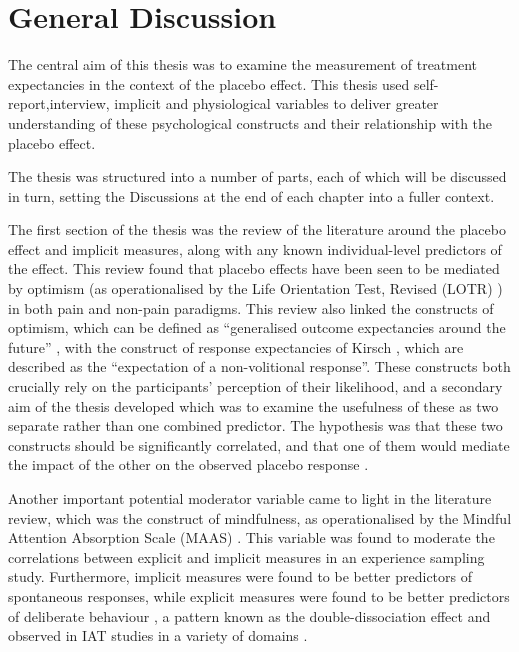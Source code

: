 

\section{General Discussion}

The central aim of this thesis was to examine the measurement of treatment
expectancies in the context of the placebo effect. This thesis used self-report,interview, implicit and physiological variables to deliver greater understanding of these psychological constructs and their relationship with the placebo effect.


The thesis was structured into a number of parts, each of which will be discussed in turn, setting the Discussions at the end of each chapter into a fuller context. 

The first section of the thesis was the review of the literature around the placebo effect and implicit measures, along with any known individual-level predictors of the effect. This review found that placebo effects have been seen to be mediated by optimism (as operationalised by the Life Orientation Test, Revised (LOTR) \cite{Scheier1994}) \cite{Geers2005,morton2009reproducibility} in both pain and non-pain paradigms. This review also linked the constructs of optimism, which can be defined as ``generalised outcome expectancies around the future'' \cite{Carver2010}, with the construct of response expectancies of Kirsch \cite{Kirsch1985,Kirsch1997}, which are described as the ``expectation of a non-volitional response''. These constructs both crucially rely on the participants' perception of their likelihood, and a secondary aim of the thesis developed which was to examine the usefulness of these as two separate rather than one combined predictor. The hypothesis was that these two constructs should be significantly correlated, and that one of them would mediate the impact of the other on the observed placebo response \cite{Geers2005}. 

Another important potential moderator variable came to light in the literature review, which was the construct of mindfulness, as operationalised by the Mindful Attention Absorption Scale (MAAS) \cite{brown2003benefits}. This variable was found to moderate the correlations between explicit and implicit measures in an experience sampling study. Furthermore, implicit measures were found to be better predictors of spontaneous responses, while explicit measures were found to be better predictors of deliberate behaviour \cite{Levesque2007}, a pattern known as the double-dissociation effect and observed in IAT studies in a variety of domains \cite{Asendorpf2002,Perugini2005,Grumm2007,Steffens2006}. 

